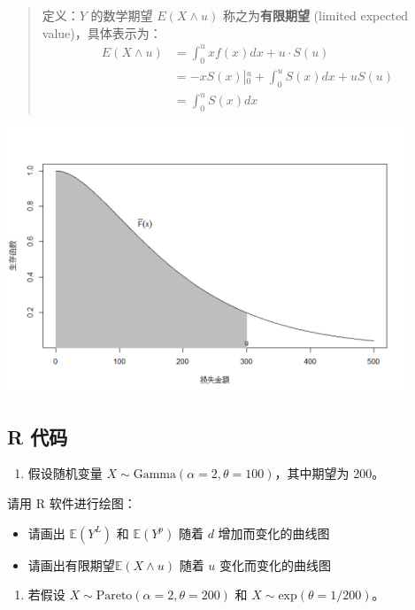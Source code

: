 \documentclass[
]{book}
\providecommand{\tightlist}{%
  \setlength{\itemsep}{0pt}\setlength{\parskip}{0pt}}
\begin{document}
\begin{quote}
定义：\(Y\) 的数学期望 \(E(X\wedge u)\) 称之为\textbf{有限期望} (limited expected value)，具体表示为：
\[
\begin{align*}
E(X\wedge u)& =\int_{0}^{u}{xf(x)dx}+u\cdot S(u) \\ 
& =-xS(x)\left| _{0}^{u} \right.+\int_{0}^{u}{S(x)dx}+uS(u) \\ 
& =\int_{0}^{u}{S(x)dx}  
\end{align*}
\]
\end{quote}

\includegraphics[width=4.6875in,height=\textheight]{picture/limit.png}

\hypertarget{r-ux4ee3ux7801}{%
\subsection{R 代码}\label{r-ux4ee3ux7801}}

\begin{enumerate}
\def\labelenumi{\arabic{enumi}.}
\tightlist
\item
  假设随机变量 \(X\sim \text{Gamma}(\alpha = 2, \theta = 100)\)，其中期望为 200。
\end{enumerate}

请用 R 软件进行绘图：

\begin{itemize}
\item
  请画出 \(\mathbb{E}(Y^L)\) 和 \(\mathbb{E}(Y^p)\) 随着 \(d\) 增加而变化的曲线图
\item
  请画出有限期望\(\mathbb{E}(X\wedge u)\) 随着 \(u\) 变化而变化的曲线图
\end{itemize}

\begin{enumerate}
\def\labelenumi{\arabic{enumi}.}
\setcounter{enumi}{1}
\tightlist
\item
  若假设 \(X\sim \text{Pareto}(\alpha=2, \theta=200)\) 和 \(X\sim \text{exp}(\theta = 1/200)\)。
\end{enumerate}
\end{document}
